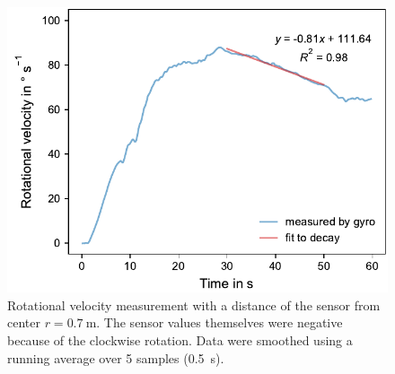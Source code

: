 \documentclass[DIV=14]{scrartcl}
\begin{document}
    \begin{figure}[h]
        \centering
        \includegraphics[width=.6\textwidth]{plots/gyro_2_decay.pdf}
        \caption{Rotational velocity measurement with a distance of the sensor from center $r=\SI{0.7}{\metre}$. The sensor values themselves were negative because of the clockwise rotation. Data were smoothed using a running average over 5 samples (\SI{0.5}{\second}).}
        \label{fig:gyro_decay}
    \end{figure}
\end{document}
